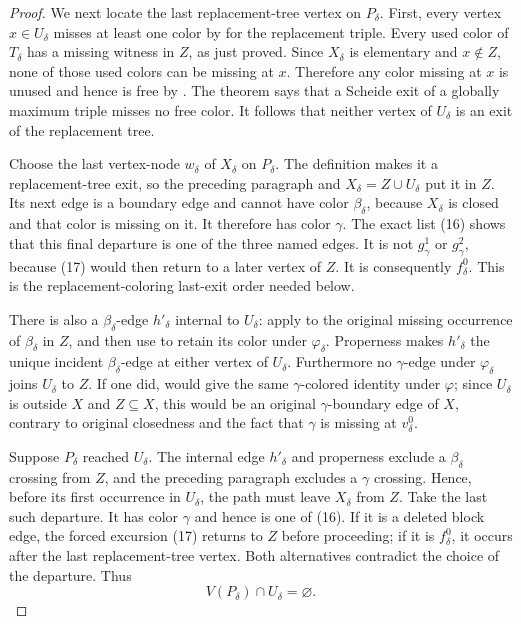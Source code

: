 \begin{proof}
We next locate the last replacement-tree vertex on $P_\delta$.  First,
every vertex $x\in U_\delta$ misses at least one color by
 for the replacement triple.
Every used color of $T_\delta$ has a missing witness in $Z$, as just
proved.  Since $X_\delta$ is elementary and $x\notin Z$, none of those
used colors can be missing at $x$.  Therefore any color missing at $x$
is unused and hence is free by .  The theorem
 says that a Scheide exit of a globally maximum
triple misses no free color.  It follows that neither vertex of
$U_\delta$ is an exit of the replacement tree.

Choose the last vertex-node $w_\delta$ of $X_\delta$ on $P_\delta$.
The definition  makes it a replacement-tree
exit, so the preceding paragraph and
$X_\delta=Z\cup U_\delta$ put it in $Z$.  Its next edge is a boundary
edge and cannot have color $\beta_\delta$, because $X_\delta$ is closed
and that color is missing on it.  It therefore has color $\gamma$.
The exact list (16) shows that this final departure is one of the three
named edges.  It is not $g^1_\gamma$ or $g^2_\gamma$, because (17) would
then return to a later vertex of $Z$.  It is consequently
$f^0_\delta$.  This is the replacement-coloring last-exit order needed
below.

There is also a $\beta_\delta$-edge $h'_\delta$ internal to $U_\delta$:
apply  to the original
missing occurrence of $\beta_\delta$ in $Z$, and then use
 to retain its color under
$\varphi_\delta$.  Properness makes $h'_\delta$ the unique incident
$\beta_\delta$-edge at either vertex of $U_\delta$.  Furthermore no
$\gamma$-edge under $\varphi_\delta$ joins $U_\delta$ to $Z$.  If one
did,  would give the same
$\gamma$-colored identity under $\varphi$; since $U_\delta$ is outside
$X$ and $Z\subseteq X$, this would be an original $\gamma$-boundary edge
of $X$, contrary to original closedness and the fact that $\gamma$ is
missing at $v^0_\delta$.

Suppose $P_\delta$ reached $U_\delta$.  The internal edge
$h'_\delta$ and properness exclude a $\beta_\delta$ crossing from $Z$,
and the preceding paragraph excludes a $\gamma$ crossing.  Hence, before
its first occurrence in $U_\delta$, the path must leave $X_\delta$ from
$Z$.  Take the last such departure.  It has color $\gamma$ and hence is
one of (16).  If it is a deleted block edge, the forced excursion (17)
returns to $Z$ before proceeding; if it is $f^0_\delta$, it occurs after
the last replacement-tree vertex.  Both alternatives contradict the
choice of the departure.  Thus
\[
 V(P_\delta)\cap U_\delta=\varnothing. \tag{18}
\]


\end{proof}
